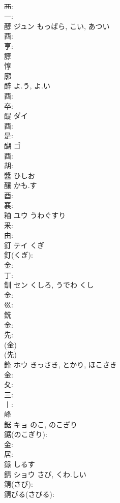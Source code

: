 \documentclass[8pt]{extreport}
\begin{document}
\begin{CJK}{UTF8}{min}
\\	襾: 
\\	一: 
\\	醇	ジュン	もっぱら, こい, あつい		
\\	酉: 
\\	享: 
\\	諄 
\\	惇 
\\	廓 
\\	醉		よ.う, よ.い				
\\	酉: 
\\	卒: 
\\	醍	ダイ			
\\	酉: 
\\	是: 
\\	醐	ゴ			
\\	酉: 
\\	胡: 
\\	醬		ひしお				
\\	釀		かも.す				
\\	酉: 
\\	襄: 
\\	釉	ユウ	うわぐすり		
\\	釆: 
\\	由: 
\\	釘	テイ	くぎ		
\\	釘(くぎ): 
\\	金: 
\\	丁: 
\\	釧	セン	くしろ, うでわ	くし	
\\	金: 
\\	巛: 
\\	銑						
\\	金: 
\\	先: 
\\	(金) 
\\	(先) 
\\	鋒	ホウ	きっさき, とかり, ほこさき		
\\	金: 
\\	夂: 
\\	三: 
\\	丨: 
\\	峰 
\\	鋸	キョ	のこ, のこぎり		
\\	鋸(のこぎり): 
\\	金: 
\\	居: 
\\	錄		しるす				
\\	錆	ショウ	さび, くわ.しい		
\\	錆(さび): 
\\	錆びる(さびる): 

\end{CJK}
\end{document}

